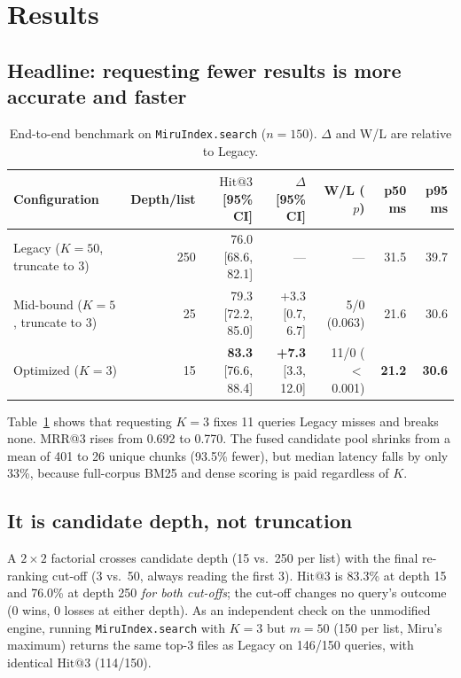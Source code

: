 \documentclass[11pt, letterpaper]{article}
\makeatletter
\newcommand{\hit}{\mathrm{Hit@3}}
\newcommand{\code}[1]{\texttt{#1}}
\makeatother
\begin{document}
\section{Results}

\subsection{Headline: requesting fewer results is more accurate and faster}\label{sec:headline}
\begin{table}[htbp]
\centering\small
\caption{End-to-end benchmark on \code{MiruIndex.search} ($n{=}150$). $\Delta$ and W/L are relative to Legacy.}
\label{tab:headline}
\begin{tabular}{@{}lrrrrrr@{}}
\toprule
Configuration & Depth/list & $\hit$ [95\% CI] & $\Delta$ [95\% CI] & W/L ($p$) & p50 ms & p95 ms \\
\midrule
Legacy ($K{=}50$, truncate to 3) & 250 & 76.0 [68.6, 82.1] & --- & --- & 31.5 & 39.7 \\
Mid-bound ($K{=}5$, truncate to 3) & 25 & 79.3 [72.2, 85.0] & +3.3 [0.7, 6.7] & 5/0 (0.063) & 21.6 & 30.6 \\
Optimized ($K{=}3$) & 15 & \textbf{83.3} [76.6, 88.4] & \textbf{+7.3} [3.3, 12.0] & 11/0 ($<$0.001) & \textbf{21.2} & \textbf{30.6} \\
\bottomrule
\end{tabular}
\end{table}

Table~\ref{tab:headline} shows that requesting $K{=}3$ fixes 11 queries Legacy misses and breaks none. MRR@3 rises
from 0.692 to 0.770. The fused candidate pool shrinks from a mean of 401 to 26 unique chunks (93.5\% fewer), but median
latency falls by only 33\%, because full-corpus BM25 and dense scoring is paid regardless of $K$.

\subsection{It is candidate depth, not truncation}\label{sec:factorial}
A $2\times2$ factorial crosses candidate depth (15 vs.\ 250 per list) with the final re-ranking cut-off (3 vs.\ 50,
always reading the first 3). $\hit$ is 83.3\% at depth 15 and 76.0\% at depth 250 \emph{for both cut-offs}; the cut-off
changes no query's outcome (0 wins, 0 losses at either depth). As an independent check on the unmodified engine,
running \code{MiruIndex.search} with $K{=}3$ but $m{=}50$ (150 per list, Miru's maximum) returns the same top-3 files as
Legacy on 146/150 queries, with identical $\hit$ (114/150).
\end{document}
